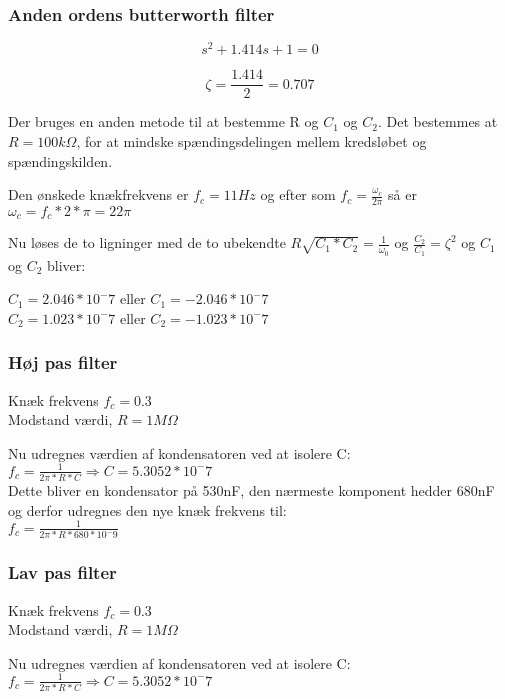 \subsubsection{Anden ordens butterworth filter}

\begin{equation}
	s^2 + 1.414s +1 = 0 
\end{equation}

\begin{equation}
	\zeta = \frac{1.414}{2} = 0.707
\end{equation}

Der bruges en anden metode til at bestemme R og $C_1$ og $C_2$. Det bestemmes at $R = 100k \Omega $, for at mindske spændingsdelingen mellem kredsløbet og spændingskilden.

Den ønskede knækfrekvens er $f_c = 11Hz$ og efter som $f_c = \frac{\omega_c}{2 \pi} $ så er $\omega_c = f_c * 2 * \pi = 22 \pi $

Nu løses de to ligninger med de to ubekendte $R \sqrt{C_1 * C_2} = \frac{1}{\omega_0}$ og $ \frac{C_2}{C_1} = \zeta^2$ og $C_1$ og $C_2$ bliver:

$C_1 = 2.046*10^-7$ eller $ C_1 = -2.046*10^-7$ \\
$C_2 = 1.023*10^-7$ eller $ C_2 = -1.023*10^-7$ \\

\subsubsection{Høj pas filter}

Knæk frekvens $f_c = 0.3$ \\
Modstand værdi, $R = 1M\Omega$

Nu udregnes værdien af kondensatoren ved at isolere C: \\
$f_c = \frac{1}{2\pi * R * C} \Rightarrow C = 5.3052 * 10^-7$ \\

Dette bliver en kondensator på 530nF, den nærmeste komponent hedder 680nF og derfor udregnes den nye knæk frekvens til:  \\
$ f_c = \frac{1}{2\pi * R * 680 * 10^-9} $

\subsubsection{Lav pas filter}
Knæk frekvens $f_c = 0.3$ \\
Modstand værdi, $R = 1M\Omega$

Nu udregnes værdien af kondensatoren ved at isolere C: \\
$f_c = \frac{1}{2\pi * R * C} \Rightarrow C = 5.3052 * 10^-7$ \\

